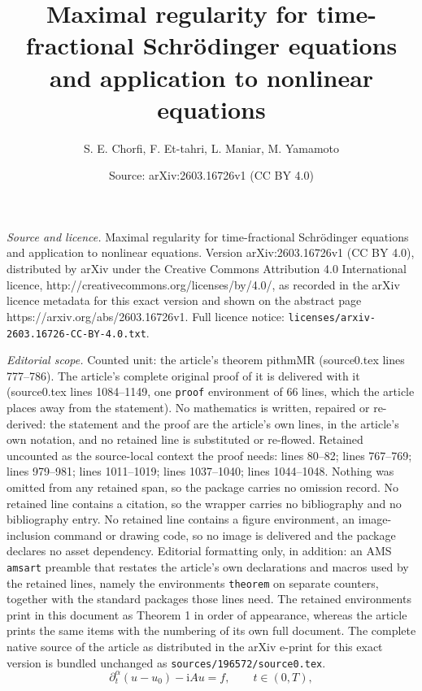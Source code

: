 \documentclass[10pt,a4paper]{amsart}
\title{Maximal regularity for time-fractional Schrödinger equations and application to nonlinear equations}
\author{S. E. Chorfi, F. Et-tahri, L. Maniar, M. Yamamoto}
\date{Source: arXiv:2603.16726v1 (CC BY 4.0)}
\begin{document}
\maketitle

\noindent\emph{Source and licence.} Maximal regularity for time-fractional Schrödinger equations and application to nonlinear equations. Version arXiv:2603.16726v1 (CC BY 4.0), distributed by arXiv under the Creative Commons Attribution 4.0 International licence, http://creativecommons.org/licenses/by/4.0/, as recorded in the arXiv licence metadata for this exact version and shown on the abstract page https://arxiv.org/abs/2603.16726v1. Full licence notice: \texttt{licenses/arxiv-2603.16726-CC-BY-4.0.txt}.\par\smallskip

\noindent\textit{Editorial scope.} Counted unit: the article's theorem pithmMR (source0.tex lines 777--786). The article's complete original proof of it is delivered with it (source0.tex lines 1084--1149, one \texttt{proof} environment of 66 lines, which the article places away from the statement). No mathematics is written, repaired or re-derived: the statement and the proof are the article's own lines, in the article's own notation, and no retained line is substituted or re-flowed.  Retained uncounted as the source-local context the proof needs: lines 80--82; lines 767--769; lines 979--981; lines 1011--1019; lines 1037--1040; lines 1044--1048.  Nothing was omitted from any retained span, so the package carries no omission record.  No retained line contains a citation, so the wrapper carries no bibliography and no bibliography entry.  No retained line contains a figure environment, an image-inclusion command or drawing code, so no image is delivered and the package declares no asset dependency.  Editorial formatting only, in addition: an AMS \texttt{amsart} preamble that restates the article's own declarations and macros used by the retained lines, namely the environments \texttt{theorem} on separate counters, together with the standard packages those lines need.  The retained environments print in this document as Theorem 1 in order of appearance, whereas the article prints the same items with the numbering of its own full document.  The complete native source of the article as distributed in the arXiv e-print for this exact version is bundled unchanged as \texttt{sources/196572/source0.tex}.
\begin{equation}\label{fseq0}
\partial_t^\alpha(u-u_0) -\mathrm{i} Au=f, \qquad t \in (0,T),
\end{equation}
\end{document}
